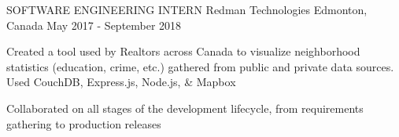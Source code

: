\begin{cventries}
  \cventry
    {SOFTWARE ENGINEERING INTERN} %
    {Redman Technologies} %
    {Edmonton, Canada} %
    {May 2017 - September 2018} %
    {
      \begin{cvitems} %
        \item {Created a tool used by Realtors across Canada to visualize neighborhood statistics (education, crime, etc.) gathered from public and private data sources. Used CouchDB, Express.js, Node.js, \& Mapbox}
        \item {Collaborated on all stages of the development lifecycle, from requirements gathering to production releases}
      \end{cvitems}
    }
\end{cventries}
